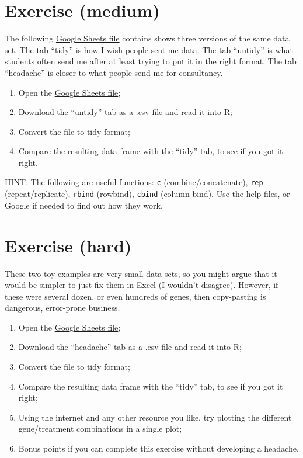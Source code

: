 \documentclass[
]{book}
\providecommand{\tightlist}{%
  \setlength{\itemsep}{0pt}\setlength{\parskip}{0pt}}
\begin{document}
\hypertarget{exercise-medium-1}{%
\section{Exercise (medium)}\label{exercise-medium-1}}

The following \href{https://docs.google.com/spreadsheets/d/1zBw0JX1JqALqF7m1CLQp4ojd1LUDoYHxnc6xIUYQVYY/}{Google Sheets file} contains shows three versions of the same data set. The tab ``tidy'' is how I wish people sent me data. The tab ``untidy'' is what students often send me after at least trying to put it in the right format. The tab ``headache'' is closer to what people send me for consultancy.

\begin{enumerate}
\def\labelenumi{\arabic{enumi}.}
\tightlist
\item
  Open the \href{https://docs.google.com/spreadsheets/d/1zBw0JX1JqALqF7m1CLQp4ojd1LUDoYHxnc6xIUYQVYY/}{Google Sheets file};
\item
  Download the ``untidy'' tab as a .csv file and read it into R;
\item
  Convert the file to tidy format;
\item
  Compare the resulting data frame with the ``tidy'' tab, to see if you got it right.
\end{enumerate}

HINT: The following are useful functions: \texttt{c} (combine/concatenate), \texttt{rep} (repeat/replicate), \texttt{rbind} (rowbind), \texttt{cbind} (column bind). Use the help files, or Google if needed to find out how they work.

\hypertarget{exercise-hard-1}{%
\section{Exercise (hard)}\label{exercise-hard-1}}

These two toy examples are very small data sets, so you might argue that it would be simpler to just fix them in Excel (I wouldn't disagree). However, if these were several dozen, or even hundreds of genes, then copy-pasting is dangerous, error-prone business.

\begin{enumerate}
\def\labelenumi{\arabic{enumi}.}
\tightlist
\item
  Open the \href{https://docs.google.com/spreadsheets/d/1zBw0JX1JqALqF7m1CLQp4ojd1LUDoYHxnc6xIUYQVYY/}{Google Sheets file};
\item
  Download the ``headache'' tab as a .csv file and read it into R;
\item
  Convert the file to tidy format;
\item
  Compare the resulting data frame with the ``tidy'' tab, to see if you got it right;
\item
  Using the internet and any other resource you like, try plotting the different gene/treatment combinations in a single plot;
\item
  Bonus points if you can complete this exercise without developing a headache.
\end{enumerate}
\end{document}
